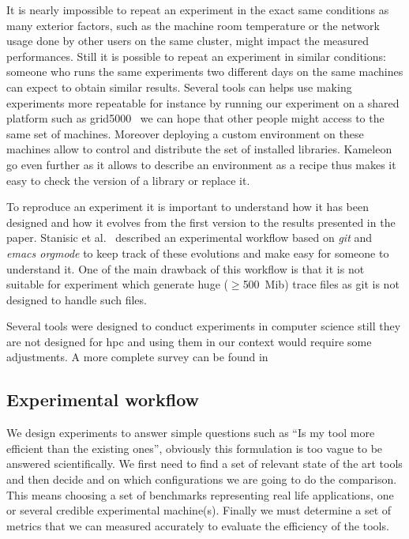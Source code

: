 It is nearly impossible to repeat an experiment in the exact same conditions
as many exterior factors, such as the machine room temperature or the network
usage done by other users on the same cluster, might impact the measured
performances.
Still it is possible to repeat an experiment in similar conditions: someone
who runs the same experiments two different days on the same machines can
expect to obtain similar results. Several tools can helps use making
experiments more repeatable for instance by running our experiment on a shared
platform such as grid5000~\cite{Cappello05Grid5000} we can hope that other
people might access to the same set of machines. Moreover deploying a custom
environment on these machines allow to control and distribute the set of
installed libraries. Kameleon~\cite{Ruiz15Reconstructable} go even
further as it allows to describe an environment as a recipe thus makes it easy
to check the version of a library or replace it.

To reproduce an experiment it is important to understand how it has been
designed and how it evolves from the first version to the results presented in
the paper. Stanisic et al.~\cite[Chapter~4, p31-44]{Stanisic15Reproducible}
described an experimental workflow based on \emph{git} and \emph{emacs orgmode}
to keep track of these evolutions and make easy for someone to understand it.
One of the main drawback of this workflow is that it is not suitable for
experiment which generate huge ($\ge$\SI{500}{Mib}) trace files as git is not
designed to handle such files.

Several tools were designed to conduct experiments in computer science still
they are not designed for \gls{hpc} and using them in our context would
require some adjustments. A more complete survey can be found
in~\cite[Chapter~3, p17-19]{Stanisic15Reproducible}

\subsection{Experimental workflow}

We design experiments to answer simple questions such as ``Is my tool more
efficient than the existing ones'', obviously this formulation is too vague to
be answered scientifically. We first need to find a set of relevant state of
the art tools and then decide and on which configurations we are going to do
the comparison. This means choosing a set of benchmarks representing real life
applications, one or several credible experimental machine(s). Finally we must
determine a set of metrics that we can measured accurately to evaluate the
efficiency of the tools.

